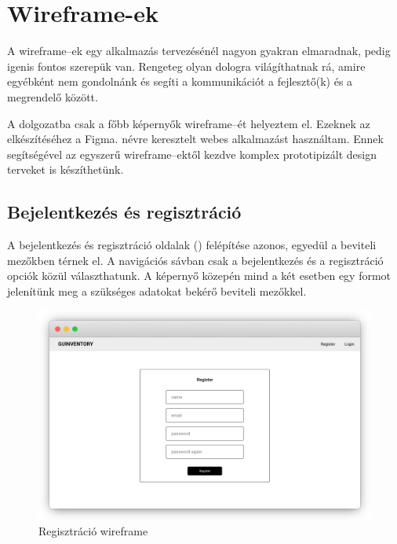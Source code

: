 \chapter{Wireframe-ek}

A wireframe–ek egy alkalmazás tervezésénél nagyon gyakran elmaradnak, pedig igenis fontos szerepük van.
Rengeteg olyan dologra világíthatnak rá, amire egyébként nem gondolnánk és segíti a kommunikációt a fejlesztő(k) és a megrendelő között.

A dolgozatba csak a főbb képernyők wireframe–ét helyeztem el. Ezeknek az elkészítéséhez a Figma\cite{Figma}. névre keresztelt webes alkalmazást használtam. 
Ennek segítségével az egyszerű wireframe–ektől kezdve komplex prototipizált design terveket is készíthetünk.

\section{Bejelentkezés és regisztráció}
A bejelentkezés és regisztráció oldalak () felépítése azonos, egyedül a beviteli mezőkben térnek el.
A navigációs sávban csak a bejelentkezés és a regisztráció opciók közül választhatunk. A képernyő közepén mind a két esetben egy formot jelenítünk meg a szükséges adatokat bekérő beviteli mezőkkel.
\begin{figure}[!ht]
  \centering
  \includegraphics[width=150mm, keepaspectratio]{figures/wireframes/frame_registration.png}
  \caption{Regisztráció wireframe}
  \label{fig:RegistrationWireframe}
\end{figure}


